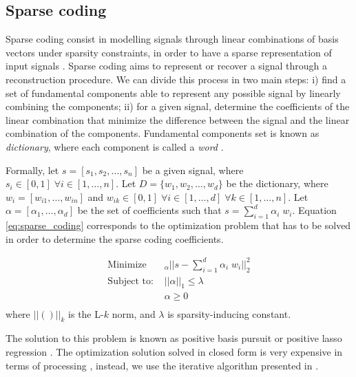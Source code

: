 \subsection{Sparse coding}
Sparse coding consist in modelling signals through linear combinations of basis vectors under sparsity constraints,
in order to have a sparse representation of input signals \citep{mairal_online_2009, bristow_fast_2013}.
%
Sparse coding aims to represent or recover a signal through a reconstruction procedure.
We can divide this process in two main steps:
i) find a set of fundamental components able to represent any possible signal by linearly combining the components;
ii) for a given signal, determine the coefficients of the linear combination that minimize the difference between the signal and the linear combination of the components.
Fundamental components set is known as \textit{dictionary}, where each component is called a \textit{word} \citep{mairal_online_2009}.
%

Formally, let $s = [s_1, s_2, \ldots, s_n]$ be a given signal, where $s_i \in [0, 1] \; \forall i \in [1, \ldots, n]$.
Let $D = \{ w_1, w_2, \ldots, w_d \}$ be the dictionary, where $w_i = [w_{i1}, \ldots, w_{in} ]$ and $w_{ik} \in [0,1] \; \forall i \in [1, \ldots, d] \; \forall k \in [1, \ldots, n]$. Let $\alpha = [ \alpha_1, \ldots,  \alpha_d]$
be the set of coefficients such that $s = \sum_{i=1}^{d} \alpha_i \; w_i $.
Equation \ref{eq:sparse_coding} corresponds to the optimization problem that has to be solved in order to determine the sparse coding coefficients.

\begin{equation}
	\label{eq:sparse_coding}
    \begin{aligned}
		\text{Minimize}
		& _{\alpha} ||s- \sum_{i=1}^{d} \alpha_i \; w_i  ||_2^2  \\
		\text{Subject to: }
		& ||\alpha||_1 \leq \lambda \\
		& \alpha \geq 0 \\
	\end{aligned}
\end{equation}
where $||()||_k$ is the L-$k$ norm, and $\lambda$ is sparsity-inducing constant.

The solution to this problem is known as positive basis pursuit \citep{chen_atomic_2001} or positive lasso regression \citep{efron_least_2004}.
The optimization solution solved in closed form is very expensive in terms of processing \citep{mairal_online_2009}, instead,
we use the iterative algorithm presented in \citet{turlach_simultaneous_2005, mairal_optimization_2013}.

